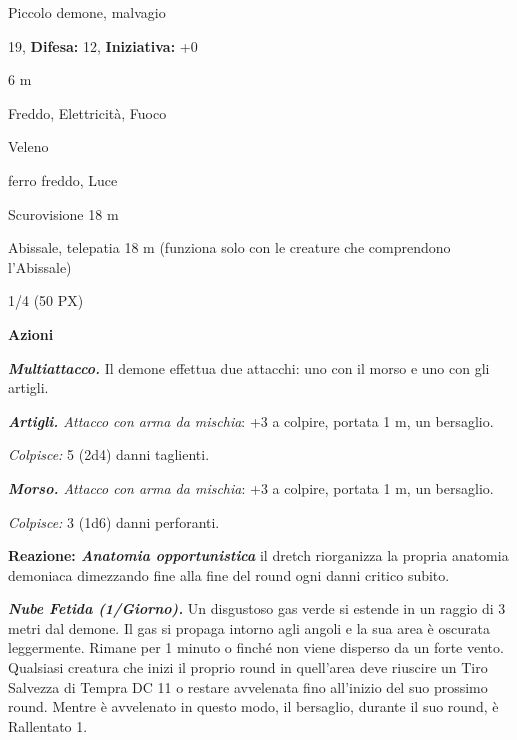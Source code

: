\begin{multicols}{2}
{
\noindent
\begin{description}[noitemsep, topsep=0pt, parsep=0pt, partopsep=0pt, leftmargin=0cm, labelwidth=2.2cm]
	\item[\textbf{Taglia/Tipo:}] Piccolo demone, malvagio
	\item[\textbf{Caratt.:}] 
	\item[\textbf{Punti Ferita:}] 19,  \textbf{Difesa:} 12,  \textbf{Iniziativa:} +0
	\item[\textbf{Movimento:}] 6 m
	\item[\textbf{Tiri Salvez.:}] 
	\item[\textbf{Res. Danni:}] Freddo, Elettricità, Fuoco
	\item[\textbf{Imm. Danni:}] Veleno
	\item[\textbf{Vulnerabilità:}] ferro freddo, Luce
	\item[\textbf{Sensi:}] Scurovisione 18 m
	\item[\textbf{Linguaggi:}] Abissale, telepatia 18 m (funziona solo con le creature che comprendono l'Abissale)
	\item[\textbf{Sfida:}] 1/4 (50 PX)\smallskip
\end{description}

\textbf{Azioni}

\emph{\textbf{Multiattacco.}} Il demone effettua due attacchi: uno con il morso e uno con gli artigli.

\emph{\textbf{Artigli.} Attacco con arma da mischia}: +3 a colpire, portata 1 m, un bersaglio.

\emph{Colpisce:} 5 (2d4) danni taglienti.

\emph{\textbf{Morso.} Attacco con arma da mischia}: +3 a colpire, portata 1 m, un bersaglio.

\emph{Colpisce:} 3 (1d6) danni perforanti.

\textbf{Reazione: \emph{Anatomia opportunistica}} il dretch riorganizza la propria anatomia demoniaca dimezzando fine alla fine del round ogni danni critico subito.

\emph{\textbf{Nube Fetida (1/Giorno).}} Un disgustoso gas verde si estende in un raggio di 3 metri dal demone. Il gas si propaga intorno agli angoli e la sua area è oscurata leggermente. Rimane per 1 minuto o finché non viene disperso da un forte vento. Qualsiasi creatura che inizi il proprio round in quell'area deve riuscire un Tiro Salvezza di Tempra DC 11 o restare avvelenata fino all'inizio del suo prossimo round. Mentre è avvelenato in questo modo, il bersaglio, durante il suo round, è Rallentato 1.

}
\end{multicols}
